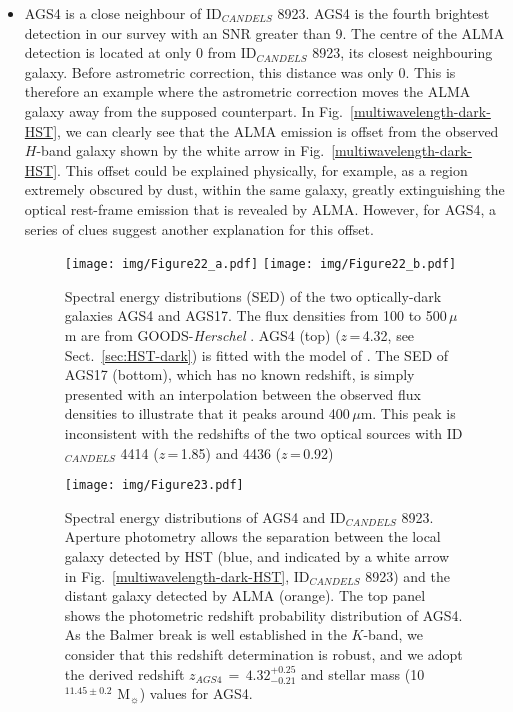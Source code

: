 \documentclass[longauth]{aa}
\begin{document}
\begin{itemize}

\item AGS4 is a close neighbour of ID$_{CANDELS}$ 8923. AGS4 is the fourth brightest detection in our survey with an SNR greater than 9. The centre of the ALMA detection is located at only 0 from ID$_{CANDELS}$ 8923, its closest neighbouring galaxy. Before astrometric correction, this distance was only 0. This is therefore an example where the astrometric correction moves the ALMA galaxy away from the supposed counterpart. In Fig.~\ref{multiwavelength-dark-HST}, we can clearly see that the ALMA emission is offset from the observed $H$-band galaxy shown by the white arrow in Fig.~\ref{multiwavelength-dark-HST}. This offset could be explained physically, for example, as a region extremely obscured by dust, within the same galaxy, greatly extinguishing the optical rest-frame emission that is revealed by ALMA.
However, for AGS4, a series of clues suggest another explanation for this offset.

\begin{figure}
\centering

\texttt{[image: img/Figure22\_a.pdf]}
\texttt{[image: img/Figure22\_b.pdf]}

\caption{Spectral energy distributions (SED) of the two optically-dark galaxies AGS4 and AGS17. The flux densities from 100 to 500\,$\mu$m are from GOODS-\textit{Herschel} \cite{Elbaz2011}. AGS4 (top) ($z$\,=\,4.32, see Sect.~\ref{sec:HST-dark}) is fitted with the model of \cite{Schreiber2017}. The SED of AGS17 (bottom), which has no known redshift, is simply presented with an interpolation between the observed flux densities to illustrate that it peaks around 400\,$\mu$m. This peak is inconsistent with the redshifts of the two optical sources with ID$_{CANDELS}$ 4414 ($z$\,=\,1.85) and 4436 ($z$\,=\,0.92)}
\label{SED}
\end{figure}


\begin{figure}
\centering
\texttt{[image: img/Figure23.pdf]}
\caption{Spectral energy distributions of AGS4 and ID$_{CANDELS}$ 8923. Aperture photometry allows the separation between the local galaxy detected by HST (blue, and indicated by a white arrow in Fig.~\ref{multiwavelength-dark-HST}, ID$_{CANDELS}$ 8923) and the distant galaxy detected by ALMA (orange). The top panel shows the photometric redshift probability distribution of AGS4. As the Balmer break is well established in the $K$-band, we consider that this redshift determination is robust, and we adopt the derived redshift $z_{AGS4}\,=\,4.32_{-0.21}^{+0.25}$ and stellar mass (10$^{11.45 \pm 0.2}$ M$_\sun$) values for AGS4.}
\label{AGS4}
\end{figure}


\end{itemize}
\end{document}
